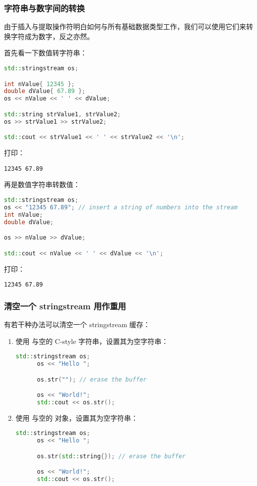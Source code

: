 \documentclass[../../LearnCpp.tex]{subfiles}
\begin{document}
\subsubsection*{字符串与数字间的转换}

由于插入与提取操作符明白如何与所有基础数据类型工作，我们可以使用它们来转换字符成为数字，反之亦然。

首先看一下数值转字符串：

\begin{lstlisting}[language=C++]
std::stringstream os;

int nValue{ 12345 };
double dValue{ 67.89 };
os << nValue << ' ' << dValue;

std::string strValue1, strValue2;
os >> strValue1 >> strValue2;

std::cout << strValue1 << ' ' << strValue2 << '\n';
\end{lstlisting}

打印：

\begin{lstlisting}
12345 67.89
\end{lstlisting}

再是数值字符串转数值：

\begin{lstlisting}[language=C++]
std::stringstream os;
os << "12345 67.89"; // insert a string of numbers into the stream
int nValue;
double dValue;

os >> nValue >> dValue;

std::cout << nValue << ' ' << dValue << '\n';
\end{lstlisting}

打印：

\begin{lstlisting}
12345 67.89
\end{lstlisting}

\subsubsection*{清空一个 stringstream 用作重用}

有若干种办法可以清空一个 stringstream 缓存：

\begin{enumerate}
      \item 使用  与空的 C-style 字符串，设置其为空字符串：
            \begin{lstlisting}[language=C++]
      std::stringstream os;
      os << "Hello ";

      os.str(""); // erase the buffer

      os << "World!";
      std::cout << os.str();
      \end{lstlisting}
      \item 使用  与空的  对象，设置其为空字符串：
            \begin{lstlisting}[language=C++]
      std::stringstream os;
      os << "Hello ";

      os.str(std::string{}); // erase the buffer

      os << "World!";
      std::cout << os.str();
      \end{lstlisting}
\end{enumerate}
\end{document}
